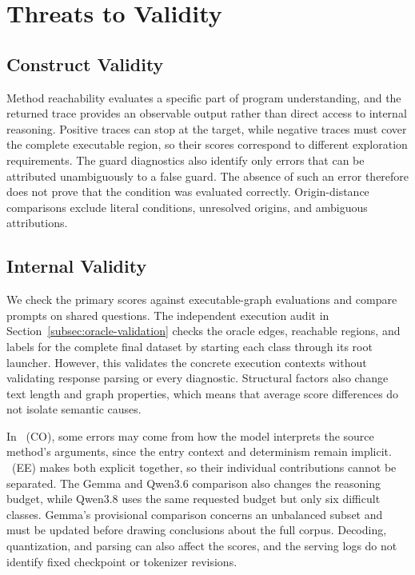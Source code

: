 \section{Threats to Validity}
\label{sec:threats}

\subsection{Construct Validity}

Method reachability evaluates a specific part of program understanding, and the returned trace provides an observable output rather than direct access to internal reasoning. Positive traces can stop at the target, while negative traces must cover the complete executable region, so their scores correspond to different exploration requirements. The guard diagnostics also identify only errors that can be attributed unambiguously to a false guard. The absence of such an error therefore does not prove that the condition was evaluated correctly. Origin-distance comparisons exclude literal conditions, unresolved origins, and ambiguous attributions.

\subsection{Internal Validity}

We check the primary scores against executable-graph evaluations and compare prompts on shared questions. The independent execution audit in Section~\ref{subsec:oracle-validation} checks the oracle edges, reachable regions, and labels for the complete final dataset by starting each class through its root launcher. However, this validates the concrete execution contexts without validating response parsing or every diagnostic. Structural factors also change text length and graph properties, which means that average score differences do not isolate semantic causes.

In \benchmark~(CO), some errors may come from how the model interprets the source method's arguments, since the entry context and determinism remain implicit. \benchmark~(EE) makes both explicit together, so their individual contributions cannot be separated. The Gemma and Qwen3.6 comparison also changes the reasoning budget, while Qwen3.8 uses the same requested budget but only six difficult classes. Gemma's provisional comparison concerns an unbalanced subset and must be updated before drawing conclusions about the full corpus. Decoding, quantization, and parsing can also affect the scores, and the serving logs do not identify fixed checkpoint or tokenizer revisions.

